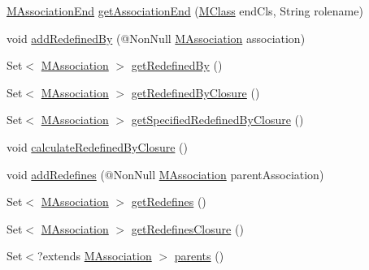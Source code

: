 \begin{DoxyCompactItemize}
\hyperlink{classorg_1_1tzi_1_1use_1_1uml_1_1mm_1_1_m_association_end}{M\-Association\-End} \hyperlink{interfaceorg_1_1tzi_1_1use_1_1uml_1_1mm_1_1_m_association_a24005a58277ff710d8ebc91ad7b4c80e}{get\-Association\-End} (\hyperlink{interfaceorg_1_1tzi_1_1use_1_1uml_1_1mm_1_1_m_class}{M\-Class} end\-Cls, String rolename)
\item 
void \hyperlink{interfaceorg_1_1tzi_1_1use_1_1uml_1_1mm_1_1_m_association_abc6263892e7cf462dd49e547e0adc40f}{add\-Redefined\-By} (@Non\-Null \hyperlink{interfaceorg_1_1tzi_1_1use_1_1uml_1_1mm_1_1_m_association}{M\-Association} association)
\item 
Set$<$ \hyperlink{interfaceorg_1_1tzi_1_1use_1_1uml_1_1mm_1_1_m_association}{M\-Association} $>$ \hyperlink{interfaceorg_1_1tzi_1_1use_1_1uml_1_1mm_1_1_m_association_a7ff61731d4fe28fe1a8e8cd4e5bf2a2b}{get\-Redefined\-By} ()
\item 
Set$<$ \hyperlink{interfaceorg_1_1tzi_1_1use_1_1uml_1_1mm_1_1_m_association}{M\-Association} $>$ \hyperlink{interfaceorg_1_1tzi_1_1use_1_1uml_1_1mm_1_1_m_association_a8797997beeaf191abc8eb1978caf7e6f}{get\-Redefined\-By\-Closure} ()
\item 
Set$<$ \hyperlink{interfaceorg_1_1tzi_1_1use_1_1uml_1_1mm_1_1_m_association}{M\-Association} $>$ \hyperlink{interfaceorg_1_1tzi_1_1use_1_1uml_1_1mm_1_1_m_association_ac6d8f05825e7b6c7660e68316604ecb4}{get\-Specified\-Redefined\-By\-Closure} ()
\item 
void \hyperlink{interfaceorg_1_1tzi_1_1use_1_1uml_1_1mm_1_1_m_association_af1ffcd6327a0ec85ded75d6f0dd7282d}{calculate\-Redefined\-By\-Closure} ()
\item 
void \hyperlink{interfaceorg_1_1tzi_1_1use_1_1uml_1_1mm_1_1_m_association_a21a01747fd86d7215a748bc12115f6e7}{add\-Redefines} (@Non\-Null \hyperlink{interfaceorg_1_1tzi_1_1use_1_1uml_1_1mm_1_1_m_association}{M\-Association} parent\-Association)
\item 
Set$<$ \hyperlink{interfaceorg_1_1tzi_1_1use_1_1uml_1_1mm_1_1_m_association}{M\-Association} $>$ \hyperlink{interfaceorg_1_1tzi_1_1use_1_1uml_1_1mm_1_1_m_association_a5954ca6c0df38aefd83fc228ee41fa2f}{get\-Redefines} ()
\item 
Set$<$ \hyperlink{interfaceorg_1_1tzi_1_1use_1_1uml_1_1mm_1_1_m_association}{M\-Association} $>$ \hyperlink{interfaceorg_1_1tzi_1_1use_1_1uml_1_1mm_1_1_m_association_aae7e7dddcbc3858e26fc968de1a31fde}{get\-Redefines\-Closure} ()
\item 
Set$<$?extends \hyperlink{interfaceorg_1_1tzi_1_1use_1_1uml_1_1mm_1_1_m_association}{M\-Association} $>$ \hyperlink{interfaceorg_1_1tzi_1_1use_1_1uml_1_1mm_1_1_m_association_ad06a9347cb6d950316cce2867de8d892}{parents} ()

\end{DoxyCompactItemize}
